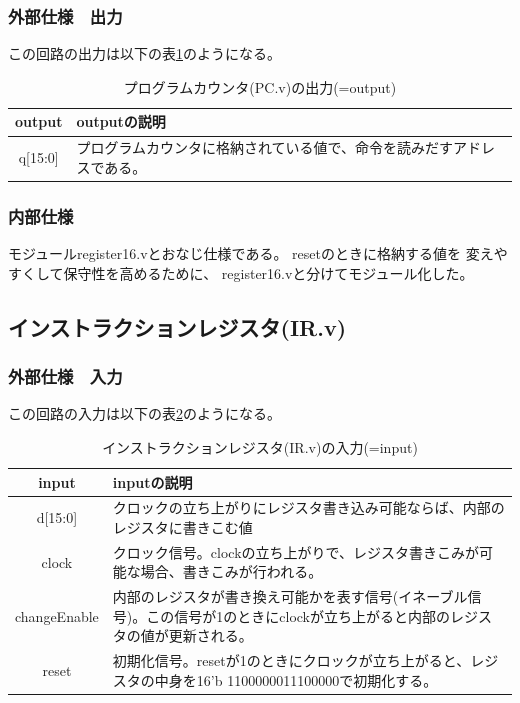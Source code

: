 \documentclass[a4j,titlepage]{jarticle}
\begin{document}
\subsubsection{外部仕様　出力}
この回路の出力は以下の表\ref{ProgramCounterO}のようになる。
\begin{table}[H]
    \caption{プログラムカウンタ(PC.v)の出力(=output)}
    \label{ProgramCounterO}
    \begin{center}
    \begin {tabularx}{150mm}{|c|X|} \hline
     output & outputの説明 \\ \hline \hline
	 q[15:0] & プログラムカウンタに格納されている値で、命令を読みだすアドレスである。\\ \hline %
\end {tabularx}
    \end{center}
\end{table}

\subsubsection{内部仕様}
モジュールregister16.vとおなじ仕様である。
resetのときに格納する値を
変えやすくして保守性を高めるために、
register16.vと分けてモジュール化した。


\newpage
\subsection{インストラクションレジスタ(IR.v)}

\subsubsection{外部仕様　入力}
この回路の入力は以下の表\ref{aaaI}のようになる。
\begin{table}[H]
    \caption{インストラクションレジスタ(IR.v)の入力(=input)}
    \label{aaaI}
    \begin{center}
    \begin {tabularx}{150mm}{|c|X|} \hline
         input & inputの説明 \\ \hline \hline
         d[15:0] & クロックの立ち上がりにレジスタ書き込み可能ならば、内部のレジスタに書きこむ値\\ \hline
         clock & クロック信号。clockの立ち上がりで、レジスタ書きこみが可能な場合、書きこみが行われる。\\ \hline %
         changeEnable & 内部のレジスタが書き換え可能かを表す信号(イネーブル信号)。この信号が1のときにclockが立ち上がると内部のレジスタの値が更新される。\\ \hline
         reset & 初期化信号。resetが1のときにクロックが立ち上がると、レジスタの中身を16'b 1100000011100000で初期化する。\\ \hline
    \end{tabularx}
    \end{center}
\end{table}
\end{document}

